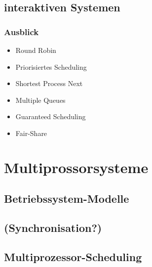\documentclass{beamer}
\begin{document}
		\subsection{interaktiven Systemen}
			\begin{frame}
				\frametitle{Ausblick}
				\begin{itemize}
					\item Round Robin
					\item Priorisiertes Scheduling
					\item Shortest Process Next
					\item Multiple Queues
					\item Guaranteed Scheduling
					\item Fair-Share
				\end{itemize}
			\end{frame}
	\section{Multiprossorsysteme}
		\subsection{Betriebssystem-Modelle}
		\subsection{(Synchronisation?)}
		\subsection{Multiprozessor-Scheduling} %
		
\end{document}
